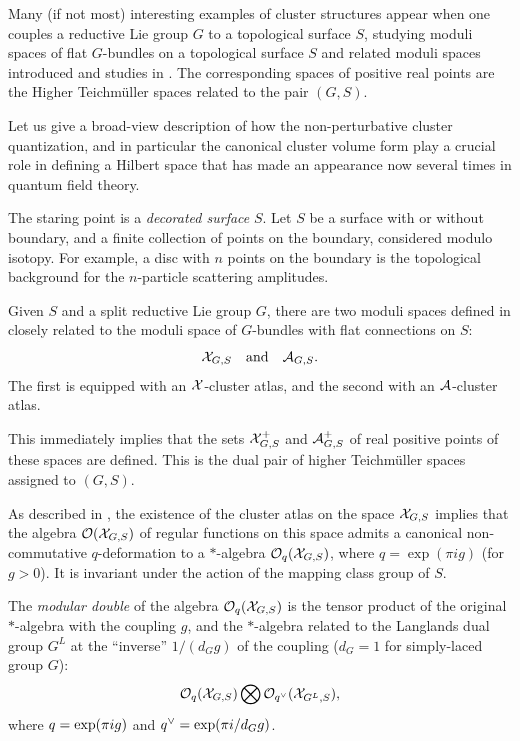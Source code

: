 \documentclass[12pt,hyperref,compress]{JHEP3}
\newcommand{\eq}[1]{\begin{equation}#1\end{equation}}
\begin{document}
Many (if not most) interesting examples of cluster structures appear when one couples a reductive Lie group $G$ to a topological surface $S$, studying moduli spaces of flat $G$-bundles on a topological surface $S$ and related moduli spaces introduced and studies in \cite{FG1}. The corresponding spaces of positive real points are the Higher Teichm\"{u}ller spaces related to the pair $(G, S)$.

Let us give a broad-view description of how the non-perturbative cluster quantization, and in particular the  canonical cluster volume form play a crucial role in defining a Hilbert space that has made an appearance now several times in quantum field theory.


The staring point is a {\it decorated surface} $S$. Let $S$ be a surface with or without boundary, and a finite collection of points on the boundary, considered modulo isotopy. For example, a disc with $n$ points on the boundary is the topological background for the $n$-particle scattering amplitudes.

Given $S$ and a split reductive Lie group $G$, there are two moduli spaces defined in \cite{FG1} closely related to the moduli space of $G$-bundles with flat connections on $S$:\\[-6pt] 
\vspace{-.2cm}\eq{{\cal X}_{G, S}\quad\mbox{and}\quad {\cal A}_{G, S}.\label{dual}\vspace{-.2cm}} 
The first is equipped with an ${\cal X}$-cluster atlas, and the second with an ${\cal A}$-cluster atlas.

This immediately implies that the sets ${\cal X}^+_{G, S}$ and ${\cal A}^+_{G, S}$ of real positive points of these spaces are defined. This is the dual pair of higher Teichm\"{u}ller spaces assigned to $(G,S)$.

As described in \cite{FG2}, the existence of the cluster atlas on the space ${\cal X}_{G, S}$ implies that the algebra ${\cal O}({\cal X}_{G, S})$ of regular functions on this space admits a canonical non-commutative $q$-deformation to a $\ast$-algebra ${\cal O}_q({\cal X}_{G, S})$, where $q\!=\!\exp(\pi i g)$ (for $g>0$). It is invariant under the action of the mapping class group of $S$.

The {\it modular double} of the algebra ${\cal O}_q({\cal X}_{G, S})$ is the tensor product of the original $\ast$-algebra with the coupling $g$, and the $\ast$-algebra related to the Langlands dual group $G^L$ at the ``inverse'' $1/(d_G g)$ of the coupling ($d_G=1$ for simply-laced group $G$): \vspace{-.2cm}\eq{{\cal O}_q({\cal X}_{G, S}) \bigotimes {\cal O}_{q^\vee}({\cal X}_{G^L, S}),\vspace{-.2cm}} where $q = {\rm exp}(\pi i g)$ and $q^\vee = {\rm exp}(\pi i /d_G g)$. 
\end{document}
